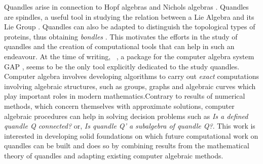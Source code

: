 \documentclass{mcom-l}
\begin{document}
\newline Quandles arise in connection to Hopf algebras and Nichols algebras \cite{andruskiewitsch2003racks}. \newline Quandles are spindles, a useful tool in studying the relation between a Lie Algebra and its Lie Group \cite{lie2algebras}. \newline Quandles can also be adapted to distinguish the topological types of proteins, thus obtaining \emph{bondles} \cite{adams2020knot}. \newline This motivates the efforts in the study of quandles and the creation of computational tools that can help in such an endeavour. At the time of writing, \rig~\cite{RiGapVendramin}, a package for the computer algebra system \textsc{GAP} \cite{GAPLinton}, seems to be the only tool explicitly dedicated to the study quandles. \newline Computer algebra involves developing algorithms to carry out \emph{exact} computations involving algebraic structures, such as groups, graphs and algebraic curves which play important roles in modern mathematics.\newline Contrary to results of numerical methods, which concern themselves with approximate solutions, computer algebraic procedures can help in solving decision problems such as \textit{Is a defined quandle Q connected?} or, \textit{Is quandle Q' a subalgebra of quandle Q?}. \newline\newline This work is interested in developing solid foundations on which future computational work on quandles can be built and does so by combining results from the mathematical theory of quandles and adapting existing computer algebraic methods. 
\end{document}
